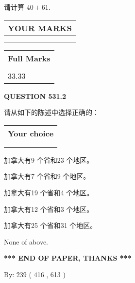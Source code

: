 \documentclass{ctexart}
\begin{document}
  
 
请计算 $ %
40 +  %
61 $.
 

 

 
  
\vspace{0.2in}
  
\noindent\begin{tabular}{|l|}
\hline
 YOUR MARKS  \\
\hline
 \\ 
 \\ 
\hline
\end{tabular}
\hspace{0.05in} \begin{tabular}{|l|}
\hline
 Full Marks  \\
\hline
 \\ 
33.33 \\
\hline
\end{tabular}
{\textbf{\Large{QUESTION
531.2 
}}}
  
  
请从如下的陈述中选择正确的：
  
  
\noindent\hspace{3.0in} \begin{tabular}{|l|}
\hline
Your choice \\
\hline
 \\ 
 \\ 
\hline
\end{tabular}
  
  
 
 
加拿大有9 个省和23 个地区。
 
 
加拿大有7 个省和9 个地区。
 
 
加拿大有19 个省和4 个地区。
 
 
加拿大有12 个省和3 个地区。
 
 
加拿大有25 个省和31 个地区。
 
 
 None of above.
 
 
   
   
 \vspace{0.2in}
 
   
   
   
   
\vspace{1.0in} 
{\textbf{\large{ *** END OF PAPER, THANKS *** }}} 
   
   
\hspace{1.0in} By: 
 239 ( 416 ,  613 )
   
\end{document}
